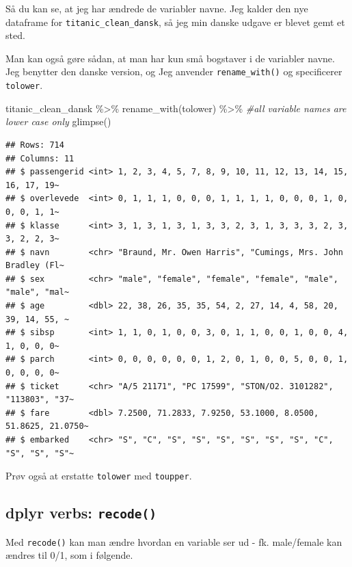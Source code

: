 \documentclass[
]{book}
\newenvironment{Shaded}{\begin{snugshade}}{\end{snugshade}}
\newcommand{\CommentTok}[1]{\textcolor[rgb]{0.56,0.35,0.01}{\textit{#1}}}
\newcommand{\FunctionTok}[1]{\textcolor[rgb]{0.00,0.00,0.00}{#1}}
\newcommand{\NormalTok}[1]{#1}
\newcommand{\SpecialCharTok}[1]{\textcolor[rgb]{0.00,0.00,0.00}{#1}}
\begin{document}
Så du kan se, at jeg har ændrede de variabler navne. Jeg kalder den nye dataframe for \texttt{titanic\_clean\_dansk}, så jeg min danske udgave er blevet gemt et sted.

Man kan også gøre sådan, at man har kun små bogstaver i de variabler navne. Jeg benytter den danske version, og Jeg anvender \texttt{rename\_with()} og specificerer \texttt{tolower}.

\begin{Shaded}
\begin{Highlighting}[]
\NormalTok{titanic\_clean\_dansk }\SpecialCharTok{\%\textgreater{}\%}
  \FunctionTok{rename\_with}\NormalTok{(tolower)  }\SpecialCharTok{\%\textgreater{}\%} \CommentTok{\#all variable names are lower case only}
  \FunctionTok{glimpse}\NormalTok{() }
\end{Highlighting}
\end{Shaded}

\begin{verbatim}
## Rows: 714
## Columns: 11
## $ passengerid <int> 1, 2, 3, 4, 5, 7, 8, 9, 10, 11, 12, 13, 14, 15, 16, 17, 19~
## $ overlevede  <int> 0, 1, 1, 1, 0, 0, 0, 1, 1, 1, 1, 0, 0, 0, 1, 0, 0, 0, 1, 1~
## $ klasse      <int> 3, 1, 3, 1, 3, 1, 3, 3, 2, 3, 1, 3, 3, 3, 2, 3, 3, 2, 2, 3~
## $ navn        <chr> "Braund, Mr. Owen Harris", "Cumings, Mrs. John Bradley (Fl~
## $ sex         <chr> "male", "female", "female", "female", "male", "male", "mal~
## $ age         <dbl> 22, 38, 26, 35, 35, 54, 2, 27, 14, 4, 58, 20, 39, 14, 55, ~
## $ sibsp       <int> 1, 1, 0, 1, 0, 0, 3, 0, 1, 1, 0, 0, 1, 0, 0, 4, 1, 0, 0, 0~
## $ parch       <int> 0, 0, 0, 0, 0, 0, 1, 2, 0, 1, 0, 0, 5, 0, 0, 1, 0, 0, 0, 0~
## $ ticket      <chr> "A/5 21171", "PC 17599", "STON/O2. 3101282", "113803", "37~
## $ fare        <dbl> 7.2500, 71.2833, 7.9250, 53.1000, 8.0500, 51.8625, 21.0750~
## $ embarked    <chr> "S", "C", "S", "S", "S", "S", "S", "S", "C", "S", "S", "S"~
\end{verbatim}

Prøv også at erstatte \texttt{tolower} med \texttt{toupper}.

\hypertarget{dplyr-verbs-recode}{%
\subsection{\texorpdfstring{dplyr verbs: \texttt{recode()}}{dplyr verbs: recode()}}\label{dplyr-verbs-recode}}

Med \texttt{recode()} kan man ændre hvordan en variable ser ud - fk. male/female kan ændres til 0/1, som i følgende.
\end{document}

